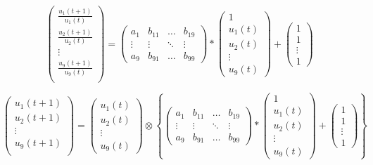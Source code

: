 \documentclass[12pt]{article}
\begin{document}
\begin{equation}
	\begin{pmatrix}
		\frac{u_{1}(t+1)}{u_{1}(t)} \\
		\frac{u_{2}(t+1)}{u_{2}(t)} \\
		\vdots \\
		\frac{u_{9}(t+1)}{u_{9}(t)} \\
	\end{pmatrix}
	=
	\begin{pmatrix}
		a_{1} & b_{11} & \ldots & b_{19} \\
		\vdots & \vdots & \ddots & \vdots \\
		a_{9} & b_{91} & \ldots & b_{99}
	\end{pmatrix}
	\ast
	\begin{pmatrix}
		1 \\
		u_{1}(t) \\
		u_{2}(t) \\
		\vdots \\
		u_{9}(t)
	\end{pmatrix}
	+
	\begin{pmatrix}
		1 \\
		1 \\
		\vdots \\
		1
	\end{pmatrix}
\end{equation}

\begin{equation}
	\begin{pmatrix}
		u_{1}(t+1) \\
		u_{2}(t+1)\\
		\vdots \\
		u_{9}(t+1) \\
	\end{pmatrix}
	=
	\begin{pmatrix}
		u_{1}(t) \\
		u_{2}(t) \\
		\vdots \\
		u_{9}(t)
	\end{pmatrix}
	\otimes 
	\left \{
	\begin{pmatrix}
		a_{1} & b_{11} & \ldots & b_{19} \\
		\vdots & \vdots & \ddots & \vdots \\
		a_{9} & b_{91} & \ldots & b_{99}
	\end{pmatrix}	
	\ast
	\begin{pmatrix}
		1 \\
		u_{1}(t) \\
		u_{2}(t) \\
		\vdots \\
		u_{9}(t)
	\end{pmatrix}
	+
	\begin{pmatrix}
		1 \\
		1 \\
		\vdots \\
		1
	\end{pmatrix}
	\right \}
\end{equation}
\end{document}
